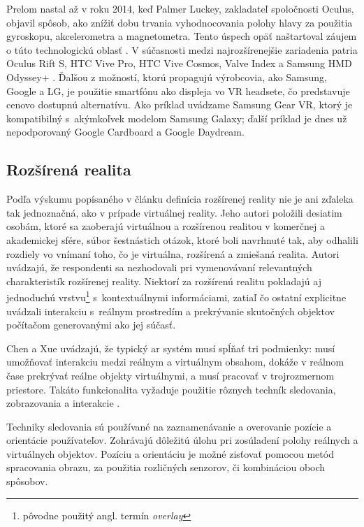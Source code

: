 Prelom nastal až v roku 2014, keď Palmer Luckey, 
zakladateľ spoločnosti Oculus, objavil spôsob, ako znížiť dobu trvania vyhodnocovania polohy hlavy za použitia gyroskopu, akcelerometra a magnetometra. 
Tento úspech opäť naštartoval záujem o túto technologickú oblasť \cite{brighamRealityCheckBasics2017}. V súčasnosti medzi najrozšírenejšie zariadenia patria Oculus Rift S,
HTC Vive Pro, HTC Vive Cosmos, Valve Index a Samsung HMD Odyssey+ \cite{angelovModernVirtualReality2020}. Ďalšou z možností, ktorú propagujú výrobcovia, ako Samsung, Google
a LG, je použitie smartfónu ako displeja vo VR headsete, čo predstavuje cenovo dostupnú alternatívu. Ako príklad uvádzame Samsung Gear VR, ktorý je kompatibilný
s~akýmkoľvek modelom Samsung Galaxy; ďalší príklad je dnes už nepodporovaný Google Cardboard a Google Daydream. 

\subsection{Rozšírená realita}
Podľa výskumu popísaného v článku \cite{speicherWhatMixedReality2019a} definícia rozšírenej reality nie je ani zďaleka tak jednoznačná, ako v prípade virtuálnej reality. 
Jeho autori položili desiatim osobám, ktoré sa zaoberajú virtuálnou a rozšírenou realitou v komerčnej a akademickej sfére, súbor šestnástich otázok, ktoré boli 
navrhnuté tak, aby odhalili rozdiely vo vnímaní toho, čo je virtuálna, rozšírená a zmiešaná realita. Autori uvádzajú, že respondenti sa nezhodovali pri vymenovávaní
relevantných charakteristík rozšírenej reality. Niektorí za rozšírenú realitu pokladajú aj jednoduchú vrstvu\footnote{pôvodne použitý angl. termín \emph{overlay}} 
s~kontextuálnymi informáciami, zatiaľ čo ostatní explicitne uvádzali interakciu s~reálnym prostredím a prekrývanie skutočných objektov počítačom generovanými 
ako jej súčasť.

Chen a Xue uvádzajú, že typický \acrshort{ar} systém musí spĺňať tri podmienky: musí umožňovať interakciu medzi reálnym a virtuálnym obsahom, dokáže v reálnom čase 
prekrývať reálne objekty virtuálnymi, a musí pracovať v trojrozmernom priestore. Takáto funkcionalita vyžaduje použitie rôznych techník sledovania, zobrazovania a
interakcie \cite{chenRenaissanceAugmentedReality2022}.

Techniky sledovania sú používané na zaznamenávanie a overovanie pozície a orientácie používateľov. Zohrávajú dôležitú úlohu pri zosúladení polohy reálnych a virtuálnych
objektov. Pozíciu a orientáciu je možné zisťovať pomocou metód spracovania obrazu, za použitia rozličných senzorov, či kombináciou oboch spôsobov.

